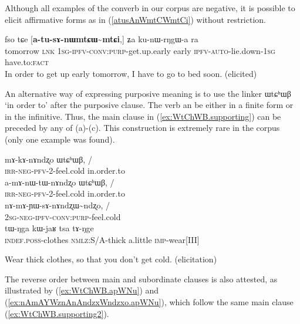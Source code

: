 \documentclass[oldfontcommands,oneside,a4paper,11pt]{article}
\newcommand{\ipa}[1]{{\phon \mbox{#1}}} %
\newcommand{\refb}[1]{(\ref{#1})}
\begin{document}
Although all examples of the converb in our corpus are negative, it is possible to elicit affirmative forms  as in \refb{atusAnWmtCWmtCi} without restriction.

\begin{exe}
\ex \label{atusAnWmtCWmtCi}
\gll
 \ipa{fso}   	\ipa{tɕe}   	[\ipa{\textbf{a-tu-sɤ-nɯmtɕɯ\textasciitilde{}mtɕi},}]   	\ipa{ʑa}   	\ipa{ku-nɯ-rŋgɯ-a}   	\ipa{ra}  \\
tomorrow \textsc{lnk} \textsc{1sg-ipfv-conv:purp}-get.up.early early \textsc{ipfv-auto}-lie.down-\textsc{1sg} have.to:\textsc{fact} 
\\
\glt In order to get up early tomorrow, I have to go to bed soon. (elicited) 
\end{exe}

 An alternative way of expressing purposive meaning is to use the linker \ipa{ɯtɕʰɯβ} `in order to'  after the purposive clause. The verb  an be either in a finite form or in the infinitive.  Thus, the main clause in \refb{ex:WtChWB.supporting}  can be preceded by any of  (a)-(c).  This construction is extremely rare in the corpus (only one example was found).
 
 \begin{exe}
\ex \label{ex:WtChWB}  \begin{xlist}
\ex
 \gll 
\ipa{mɤ-kɤ-nɤndʐo} 	\ipa{ɯtɕʰɯβ,} 	/\\
 \textsc{irr-neg-pfv}-2-feel.cold in.order.to\\
 \ex
 \gll 
\ipa{a-mɤ-nɯ-tɯ-nɤndʐo} 	\ipa{ɯtɕʰɯβ,} / \\
 \textsc{irr-neg-pfv}-2-feel.cold in.order.to\\
 \ex \label{ex:nAmAsAnAndzxWndzxo}  
 \gll 
 \ipa{nɤ-mɤ-ɲɯ-sɤ-nɤndʐɯ\textasciitilde{}ndʐo,} /\\
 \textsc{2sg-neg-ipfv-conv:purp}-feel.cold\\
 \ex  \label{ex:WtChWB.supporting}  
 \gll 
 \ipa{tɯ-ŋga}    	\ipa{kɯ-jaʁ}    	\ipa{tsa}    	\ipa{tɤ-ŋge}  \\
 \textsc{indef.poss}-clothes \textsc{nmlz}:S/A-thick a.little \textsc{imp}-wear[III] \\
  \end{xlist}
 \glt Wear thick clothes, so that you don't get cold. (elicitation)
  \end{exe}
 
The reverse order  between main and subordinate clauses is also attested,   as illustrated by \refb{ex:WtChWB.apWNu} and \refb{ex:nAmAYWznAnAndzxWndzxo.apWNu}, which follow the same   main clause \refb{ex:WtChWB.supporting2}.
\end{document}
